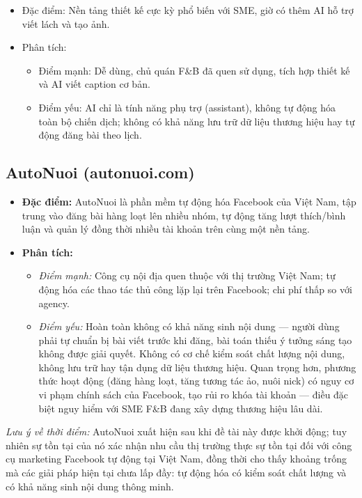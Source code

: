 \begin{itemize}
\item
  Đặc điểm: Nền tảng thiết kế cực kỳ phổ biến với SME, giờ có thêm AI
  hỗ trợ viết lách và tạo ảnh.
\item
  Phân tích:

  \begin{itemize}
  \item
    Điểm mạnh: Dễ dùng, chủ quán F\&B đã quen sử dụng, tích hợp thiết
    kế và AI viết caption cơ bản.
  \item
    Điểm yếu: AI chỉ là tính năng phụ trợ (assistant), không tự động hóa
    toàn bộ chiến dịch; không có khả năng lưu trữ dữ liệu thương hiệu
    hay tự động đăng bài theo lịch.
  \end{itemize}
\end{itemize}

\subsection{AutoNuoi (autonuoi.com)}\label{subsec:autonuoi}

\begin{itemize}
\item
  \textbf{Đặc điểm:} AutoNuoi là phần mềm tự động hóa Facebook của Việt
  Nam, tập trung vào đăng bài hàng loạt lên nhiều nhóm, tự động tăng
  lượt thích/bình luận và quản lý đồng thời nhiều tài khoản trên cùng
  một nền tảng.
\item
  \textbf{Phân tích:}

  \begin{itemize}
  \item
    \textit{Điểm mạnh:} Công cụ nội địa quen thuộc với thị trường Việt
    Nam; tự động hóa các thao tác thủ công lặp lại trên Facebook; chi
    phí thấp so với agency.
  \item
    \textit{Điểm yếu:} Hoàn toàn không có khả năng sinh nội dung ---
    người dùng phải tự chuẩn bị bài viết trước khi đăng, bài toán thiếu
    ý tưởng sáng tạo không được giải quyết. Không có cơ chế kiểm soát
    chất lượng nội dung, không lưu trữ hay tận dụng dữ liệu thương
    hiệu. Quan trọng hơn, phương thức hoạt động (đăng hàng loạt, tăng
    tương tác ảo, nuôi nick) có nguy cơ vi phạm chính sách của Facebook,
    tạo rủi ro khóa tài khoản --- điều đặc biệt nguy hiểm với SME F\&B
    đang xây dựng thương hiệu lâu dài.
  \end{itemize}
\end{itemize}

\textit{Lưu ý về thời điểm:} AutoNuoi xuất hiện sau khi đề tài này được
khởi động; tuy nhiên sự tồn tại của nó xác nhận nhu cầu thị trường thực
sự tồn tại đối với công cụ marketing Facebook tự động tại Việt Nam, đồng
thời cho thấy khoảng trống mà các giải pháp hiện tại chưa lấp đầy: tự
động hóa có kiểm soát chất lượng và có khả năng sinh nội dung thông minh.

